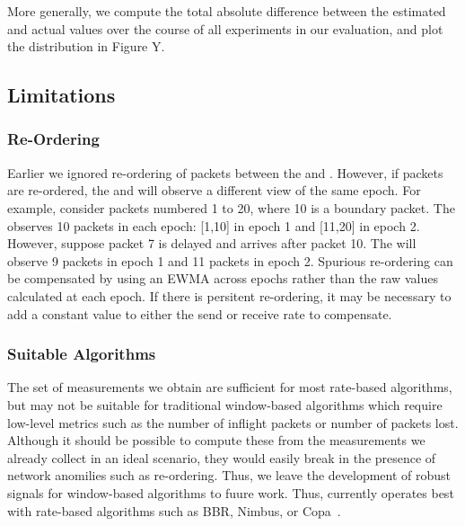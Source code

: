     More generally, we compute the total absolute difference between the estimated and actual values over the course of all experiments in our evaluation, and plot the distribution in Figure Y.
    
\subsection{Limitations}
\subsubsection{Re-Ordering}
\label{s:measure:limitation:reorder}
Earlier we ignored re-ordering of packets between the \inbox and \outbox. However, if packets
are re-ordered, the \inbox and \outbox will observe a different view of the same epoch.
For example, consider packets numbered 1 to 20, where 10 is a boundary packet. The \inbox observes
10 packets in each epoch: [1,10] in epoch 1 and [11,20] in epoch 2. 
However, suppose packet 7 is delayed and arrives after packet 10. The \outbox will observe 9
packets in epoch 1 and 11 packets in epoch 2. 
Spurious re-ordering can be compensated by using an EWMA across epochs rather than the raw values
calculated at each epoch. If there is persitent re-ordering, it may be necessary to add a constant 
value to either the send or receive rate to compensate.

\subsubsection{Suitable Algorithms}
\label{s:measure:limitation:algs}
The set of measurements we obtain are sufficient for most rate-based algorithms, but may not be 
suitable for traditional window-based algorithms which require low-level metrics such as 
the number of inflight packets or number of packets lost. Although it should be possible
to compute these from the measurements we already collect in an ideal scenario, they would easily
break in the presence of network anomilies such as re-ordering. Thus, we leave the development
of robust signals for window-based algorithms to fuure work. 
Thus, \name currently operates best with rate-based algorithms such as BBR, Nimbus, or Copa~\cite{bbr,nimbus,copa}.
